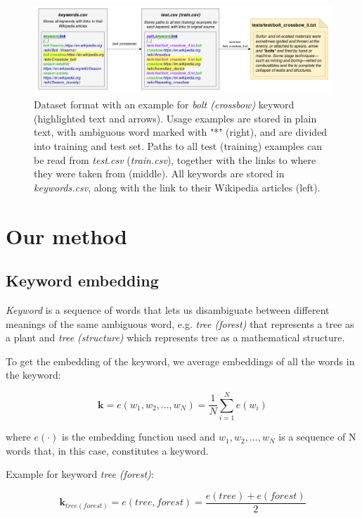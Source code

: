 \documentclass{llncs}
\begin{document}
\begin{figure}
    \centering
    \caption{Dataset format with an example for \textit{bolt (crossbow)} keyword (highlighted text and arrows). Usage examples are stored in plain text, with ambiguous word marked with "*" (right), and are divided into training and test set. Paths to all test (training) examples can be read from \textit{test.csv} (\textit{train.csv}), together with the links to where they were taken from (middle). All keywords are stored in \textit{keywords.csv}, along with the link to their Wikipedia articles (left).}
    \label{fig:dataset_format}
    \includegraphics[scale=0.35]{res/dataset_format.png}
\end{figure}


\section{Our method}
\subsection{Keyword embedding}
\label{sec:kw_embed}
\textit{Keyword} is a sequence of words that lets us disambiguate between different meanings of the same ambiguous word, e.g. \textit{tree (forest)} that represents a tree as a plant and \textit{tree (structure)} which represents tree as a mathematical structure.

To get the embedding of the keyword, we average embeddings of all the words in the keyword:

\begin{equation}
    \label{eq:keyword_embedding}
    \bm{k} = e(w_1, w_2, ..., w_N) = \frac{1}{N}\sum_{i=1}^{N} e(w_i)
\end{equation}

where \(e(\cdot)\) is the embedding function used and \(w_1, w_2, ..., w_N\) is a sequence of N words that, in this case, constitutes a keyword.

Example for keyword \textit{tree (forest)}:

\begin{equation}
    \label{eq:example_kw_embed}
    \bm{k}_{tree (forest)} = e(tree, forest) = \frac{e(tree) + e(forest)}{2}
\end{equation}
\end{document}

